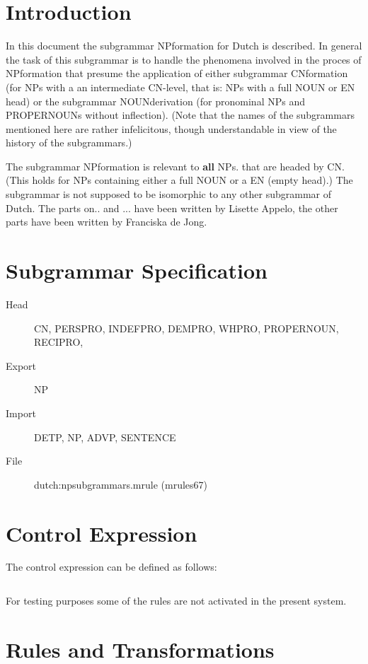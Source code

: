 

   \RosDate{\today}
   \RosSupersedes{-}
   \MakeRosTitle
%
%


\section{Introduction}
In this document the subgrammar NPformation for Dutch is described.
In general the task of this subgrammar 
is to handle the phenomena involved in the proces of NPformation
that presume the application of either subgrammar CNformation (for NPs with a 
an intermediate CN-level, that is: NPs with a full NOUN 
or EN head) or the subgrammar NOUNderivation 
(for pronominal NPs and PROPERNOUNs without 
inflection). (Note that the names of the subgrammars mentioned here are rather
infelicitous, though understandable in view of the history of the subgrammars.)

The subgrammar NPformation is relevant to {\bf all} 
NPs. 
that are headed by CN. (This holds for NPs containing either a full NOUN or a 
EN (empty head).)
The subgrammar is not supposed to be isomorphic to any other subgrammar 
of Dutch. 
The parts on.. and ... have been written by 
Lisette Appelo, the other parts have been written by Franciska de Jong.


\section{Subgrammar Specification}

\begin{description}
  \item[Head] CN, PERSPRO, INDEFPRO, DEMPRO, WHPRO, PROPERNOUN, RECIPRO,
  \item[Export] NP
  \item[Import] DETP, NP, ADVP, SENTENCE      
  \item[File] dutch:npsubgrammars.mrule (mrules67)
\end{description}

\section{Control Expression}
The control expression can be defined as follows:
\begin{verbatim}
\end{verbatim}
For testing purposes some of the rules are not activated in the present 
system. 

\section{Rules and Transformations}

